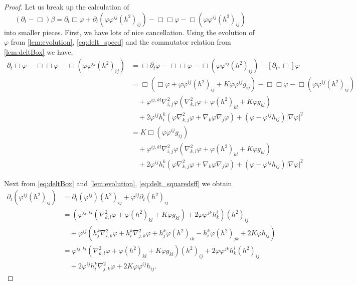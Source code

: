 \documentclass{amsart}
\begin{document}
\begin{proof}
Let us break up the calculation of
\[
(\partial_{t} - \Box)\beta =  \partial_{t}\Box\varphi + \partial_{t} (\varphi\varphi^{ij} (h^2)_{ij}) - \Box\Box\varphi - \Box(\varphi\varphi^{ij} (h^2)_{ij})
\]
into smaller pieces. First, we have lots of nice cancellation. Using the evolution of \(\varphi\) from \cref{lem:evolution}, \cref{eq:delt_speed} and the commutator relation from \cref{lem:deltBox} we have,
\begin{equation}
\label{eq:deltbeta1}
\begin{split}
\partial_{t}\Box\varphi - \Box\Box\varphi - \Box(\varphi\varphi^{ij} (h^2)_{ij}) &= \Box\partial_t\varphi - \Box\Box\varphi - \Box(\varphi\varphi^{ij} (h^2)_{ij}) + [\partial_t, \Box] \varphi \\
&= \Box(\Box \varphi + \varphi\varphi^{ij}(h^2)_{ij} + K \varphi\varphi^{ij}g_{ij}) - \Box\Box\varphi - \Box(\varphi\varphi^{ij} (h^2)_{ij}) \\
&\quad + \varphi^{ij,kl} \nabla^2_{i,j} \varphi (\nabla^2_{k,l} \varphi + \varphi (h^2)_{kl} + K \varphi g_{kl}) \\
&\quad + 2\varphi^{ij}h^{k}_{i} (\varphi \nabla^2_{k,j} \varphi + \nabla_k \varphi \nabla_j \varphi) + (\varphi - \varphi^{ij}h_{ij})| \nabla\varphi|^{2} \\
&= K\Box(\varphi\varphi^{ij}g_{ij}) \\
&\quad + \varphi^{ij,kl} \nabla^2_{i,j} \varphi (\nabla^2_{k,l} \varphi + \varphi (h^2)_{kl} + K \varphi g_{kl}) \\
&\quad + 2\varphi^{ij}h^{k}_{i} (\varphi \nabla^2_{k,j} \varphi + \nabla_k \varphi \nabla_j \varphi) + (\varphi - \varphi^{ij}h_{ij})| \nabla\varphi|^{2}
\end{split}
\end{equation}

Next from \cref{eq:deltBox} and \cref{lem:evolution}, \cref{eq:delt_squaredsff} we obtain
\[
\begin{split}
\partial_{t} (\varphi^{ij}(h^2)_{ij}) &= \partial_{t}(\varphi^{ij}) (h^2)_{ij} + \varphi^{ij} \partial_t (h^2)_{ij} \\
&= \left(\varphi^{ij,kl} \left(\nabla^2_{k,l} \varphi + \varphi(h^2)_{kl} + K \varphi g_{kl}\right) + 2\varphi\varphi^{jk}h^{i}_{k}\right) (h^2)_{ij} \\
&\quad + \varphi^{ij} \left(h^k_j \nabla^2_{i,k} \varphi + h^k_i \nabla^2_{j,k} \varphi + h^k_j \varphi(h^2)_{ik} - h^k_i \varphi(h^2)_{jk} + 2K\varphi h_{ij}\right) \\
&= \varphi^{ij,kl} \left(\nabla^2_{k,l} \varphi + \varphi(h^2)_{kl} + K \varphi g_{kl}\right)(h^2)_{ij} + 2\varphi\varphi^{jk}h^{i}_{k} (h^2)_{ij} \\
&\quad + 2 \varphi^{ij} h^k_i \nabla^2_{j,k} \varphi  + 2K\varphi\varphi^{ij}h_{ij}.
\end{split}
\]


\end{proof}
\end{document}
